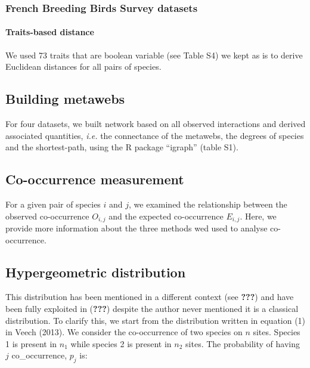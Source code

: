 \subsubsection{French Breeding Birds Survey
datasets}\label{french-breeding-birds-survey-datasets}

\paragraph{Traits-based distance}\label{traits-based-distance-1}

We used 73 traits that are boolean variable (see Table S4) we kept as is
to derive Euclidean distances for all pairs of species.

\subsection{Building metawebs}\label{building-metawebs}

For four datasets, we built network based on all observed interactions
and derived associated quantities, \emph{i.e.} the connectance of the
metawebs, the degrees of species and the shortest-path, using the R
package ``igraph'' (table S1).

\subsection{Co-occurrence measurement}\label{co-occurrence-measurement}

For a given pair of species \(i\) and \(j\), we examined the
relationship between the observed co-occurrence \(O_{i,j}\) and the
expected co-occurrence \(E_{i,j}\). Here, we provide more information
about the three methods wed used to analyse co-occurrence.

\subsection{Hypergeometric
distribution}\label{hypergeometric-distribution}

This distribution has been mentioned in a different context (see
{\textbf{???}}) and have been fully exploited in ({\textbf{???}})
despite the author never mentioned it is a classical distribution. To
clarify this, we start from the distribution written in equation (1) in
Veech (2013). We consider the co-occurrence of two species on \(n\)
sites. Species 1 is present in \(n_1\) while species 2 is present in
\(n_2\) sites. The probability of having \(j\) co\_occurrence, \(p_j\)
is:

